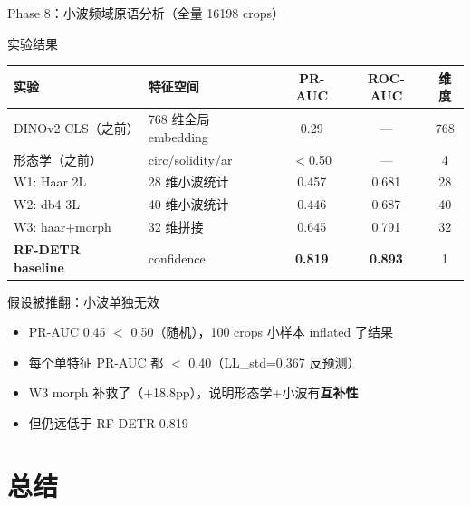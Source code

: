 \documentclass[aspectratio=169, 10pt]{beamer}
\begin{document}
\begin{frame}{Phase 8：小波频域原语分析（全量 16198 crops）}
  \begin{block}{实验结果}
    \begin{tabular}{llccc}
      \toprule
      \textbf{实验} & \textbf{特征空间} & \textbf{PR-AUC} & \textbf{ROC-AUC} & \textbf{维度} \\
      \midrule
      DINOv2 CLS（之前） & 768 维全局 embedding & 0.29 & — & 768 \\
      形态学（之前） & circ/solidity/ar & $<$0.50 & — & 4 \\
      \midrule
      W1: Haar 2L & 28 维小波统计 & \alert{0.457} & 0.681 & 28 \\
      W2: db4 3L & 40 维小波统计 & \alert{0.446} & 0.687 & 40 \\
      W3: haar+morph & 32 维拼接 & 0.645 & 0.791 & 32 \\
      \midrule
      \textbf{RF-DETR baseline} & confidence & \textbf{0.819} & \textbf{0.893} & 1 \\
      \bottomrule
    \end{tabular}
  \end{block}
  \vspace{0em}
  \begin{alertblock}{假设被推翻：小波单独无效}
    \begin{itemize}
      \item PR-AUC 0.45 $<$ 0.50（随机），100 crops 小样本 inflated 了结果
      \item 每个单特征 PR-AUC 都 $<$ 0.40（LL\_std=0.367 反预测）
      \item W3 morph 补救了（+18.8pp），说明形态学+小波有\textbf{互补性}
      \item 但仍远低于 RF-DETR 0.819
    \end{itemize}
  \end{alertblock}
\end{frame}


\section{总结}
\end{document}
